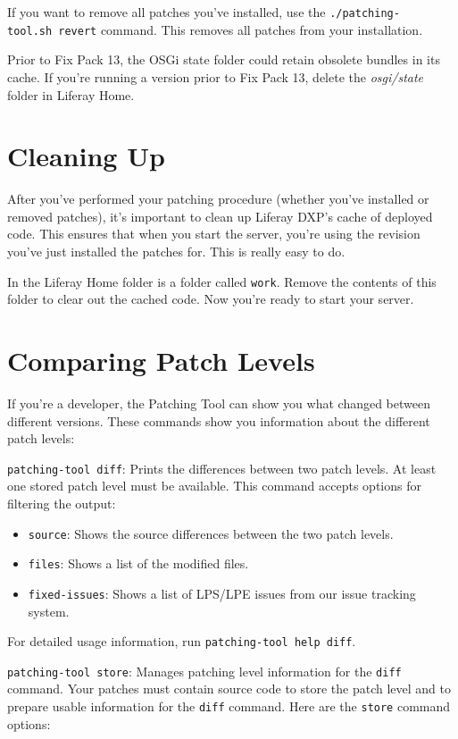 If you want to remove all patches you've installed, use the
\texttt{./patching-tool.sh\ revert} command. This removes all patches
from your installation.

Prior to Fix Pack 13, the OSGi state folder could retain obsolete
bundles in its cache. If you're running a version prior to Fix Pack 13,
delete the \emph{osgi/state} folder in Liferay Home.

\section{Cleaning Up}\label{cleaning-up}

After you've performed your patching procedure (whether you've installed
or removed patches), it's important to clean up Liferay DXP's cache of
deployed code. This ensures that when you start the server, you're using
the revision you've just installed the patches for. This is really easy
to do.

In the Liferay Home folder is a folder called \texttt{work}. Remove the
contents of this folder to clear out the cached code. Now you're ready
to start your server.

\section{Comparing Patch Levels}\label{comparing-patch-levels}

If you're a developer, the Patching Tool can show you what changed
between different versions. These commands show you information about
the different patch levels:

\texttt{patching-tool\ diff}: Prints the differences between two patch
levels. At least one stored patch level must be available. This command
accepts options for filtering the output:

\begin{itemize}
\tightlist
\item
  \texttt{source}: Shows the source differences between the two patch
  levels.
\item
  \texttt{files}: Shows a list of the modified files.
\item
  \texttt{fixed-issues}: Shows a list of LPS/LPE issues from our issue
  tracking system.
\end{itemize}

For detailed usage information, run \texttt{patching-tool\ help\ diff}.

\texttt{patching-tool\ store}: Manages patching level information for
the \texttt{diff} command. Your patches must contain source code to
store the patch level and to prepare usable information for the
\texttt{diff} command. Here are the \texttt{store} command options:

